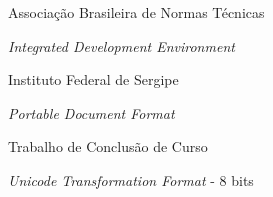 


\begin{siglas}
    \item[ABNT] Associação Brasileira de Normas Técnicas
    \item[IDE] \textit{Integrated Development Environment}
    \item[IFS] Instituto Federal de Sergipe
    \item[PDF] \textit{Portable Document Format}
    \item[TCC] Trabalho de Conclusão de Curso
    \item[UTF-8] \textit{Unicode Transformation Format} - 8 bits
\end{siglas}
